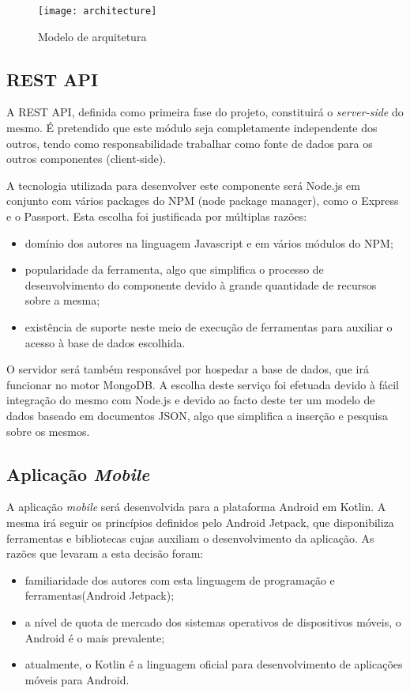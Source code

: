 \begin{figure}[h]
	\centering
	\texttt{[image: architecture]}
	\caption{Modelo de arquitetura}
\end{figure}


\subsection{REST API}
A REST API, definida como primeira fase do projeto, constituirá o \textit{server-side} do mesmo. É pretendido que este módulo seja completamente independente dos outros, tendo como responsabilidade trabalhar como fonte de dados para os outros componentes (client-side). \par \medskip 

A tecnologia utilizada para desenvolver este componente será Node.js em conjunto com vários packages do NPM (node package manager), como o Express e o Passport. Esta escolha foi justificada por múltiplas razões:
\begin{itemize}
	\item domínio dos autores na linguagem Javascript e em vários módulos do NPM;
	\item popularidade da ferramenta, algo que simplifica o processo de desenvolvimento do componente devido à grande quantidade de recursos sobre a mesma;
	\item existência de suporte neste meio de execução de ferramentas para auxiliar o acesso à base de dados escolhida.
\end{itemize}
\par \medskip

O servidor será também responsável por hospedar a base de dados, que irá funcionar no motor MongoDB. A escolha deste serviço foi efetuada devido à fácil integração do mesmo com Node.js e devido ao facto deste ter um modelo de dados baseado em documentos JSON, algo que simplifica a inserção e pesquisa sobre os mesmos.
\par \medskip

\subsection{Aplicação \textit{Mobile}}
A aplicação \textit{mobile} será desenvolvida para a plataforma Android em Kotlin. A mesma irá seguir os princípios definidos pelo Android Jetpack, que disponibiliza ferramentas e bibliotecas cujas auxiliam o desenvolvimento da aplicação. As razões que levaram a esta decisão foram:
\begin{itemize}
	\item familiaridade dos autores com esta linguagem de programação e ferramentas(Android Jetpack);
	\item a nível de quota de mercado dos sistemas operativos de dispositivos móveis, o Android é o mais prevalente;
	\item atualmente, o Kotlin é a linguagem oficial para desenvolvimento de aplicações móveis para Android.
\end{itemize}


